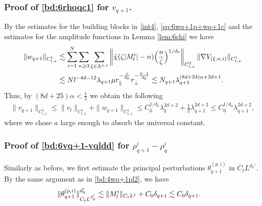 \documentclass[10pt,a4paper]{amsart}
\numberwithin{equation}{section}
\def\({{\Big(}}
\def\){{\Big)}}
\newcommand{\norm}[1]{\left\|#1\right\|}
\def\geq{\geqslant}
\def\leq{\leqslant}
\def\({{\Big(}}
\def\){{\Big)}}
\def\geq{\geqslant}
\def\leq{\leqslant}
\begin{document}
\subsubsection{Proof of  \eqref{bd:6rhoqc1} for $v_{q+1}$.}
 By the estimates for the building blocks in \eqref{int4},  \eqref{eq:6wq+1p+wq+1c} and the estimates for the amplitude functions in Lemma \ref{lem:6chi} we have  
\begin{align}
\|w_{q+1}\|_{C_{t,x}^1}&\lesssim\sum_{i=1}^{N}\sum_{n\geq3}\sum_{\xi\in\Lambda^{n,i}}\norm{\tilde{\chi}(\zeta|M^{i}_l|-n)\(\frac{n}{\zeta}\)^{1/d_0}}_{C_{t,x}^{2}}\|\nabla V_{(\xi,n,i)}\|_{C_{t,x}^1} \notag\\
&\lesssim Nl^{-4d-12}\lambda_{q+1}\mu r_\parallel^{-\frac{1}{d_0}}r_\perp^{-\frac{d-1}{d_0}} \lesssim N_{q+1}\lambda_{q+1}^{(8d+24)\alpha+2d+1}.\notag
\end{align}
 Thus, by $ (8d+25)\alpha<\frac{1}{2}$ we obtain the following
 \begin{align*}
\|v_{q+1}\|_{C_{t,x}^1}\leq\|v_{l}\|_{C_{t,x}^1}+\|w_{q+1}\|_{C_{t,x}^1}\leq C_0^{1/d_0}\lambda_{q}^{2d+2}+\frac12\lambda_{q+1}^{2d+2}\leq C_0^{1/d_0}\lambda_{q+1}^{2d+2},
 \end{align*} where we chose $a$ large enough to absorb the universal constant.


\subsubsection{Proof of  \eqref{bd:6vq+1-vqldd} for $\rho^{i}_{q+1}-\rho_q^i$} 
Similarly as before, we first estimate the principal perturbations  $\theta^{(p,i)}_{q+1}$ in $C_tL^{d_0'}$. %
By the same argument as in \eqref{bd:4wq+1pl2}, we have 
\begin{align}
    \|\theta_{q+1}^{(p,i)}\|_{C_tL^{d_0'}}^{d_0'}&\lesssim \|M^{i}_l\|_{C_tL^1}+ C_0\delta_{q+1} 
    \lesssim  C_0\delta_{q+1}. \notag
\end{align} 
\end{document}
